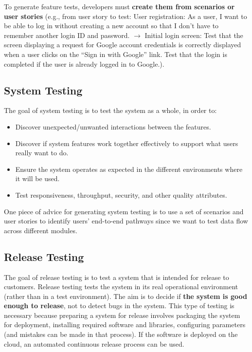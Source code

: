 To generate feature tests, developers must \textbf{create them from scenarios or user stories} (e.g., from user story to test: User registration: As a user, I want to be able to log in without creating a new account so that I don't have to remember another login ID and password. $\rightarrow$ Initial login screen: Test that the screen displaying a request for Google account credentials is correctly displayed when a user clicks on the ``Sign in with Google'' link. Test that the login is completed if the user is already logged in to Google.).

\subsection{System Testing}

The goal of system testing is to test the system as a whole, in order to:

\begin{itemize}
	\item Discover unexpected/unwanted interactions between the features.
	\item Discover if system features work together effectively to support what users really want to do.
	\item Ensure the system operates as expected in the different environments where it will be used.
	\item Test responsiveness, throughput, security, and other quality attributes.
\end{itemize}

One piece of advice for generating system testing is to use a set of scenarios and user stories to identify users’ end-to-end pathways since we want to test data flow across different modules.

\subsection{Release Testing}

The goal of release testing is to test a system that is intended for release to customers. Release testing tests the system in its real operational environment (rather than in a test environment). The aim is to decide if \textbf{the system is good enough to release}, not to detect bugs in the system. This type of testing is necessary because preparing a system for release involves packaging the system for deployment, installing required software and libraries, configuring parameters (and mistakes can be made in that process). If the software is deployed on the cloud, an automated continuous release process can be used.

